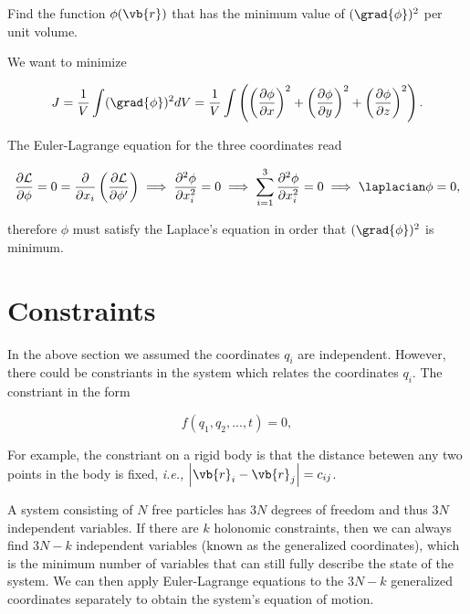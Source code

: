 \documentclass[a4paper,12pt]{report}
\begin{document}
{Find the function \(\phi (\vb{r} )\) that has the minimum value of \((\grad{\phi })^2\) per unit volume.  }
{We want to minimize 

\begin{equation}
	J = \frac{1}{V} \int (\grad{\phi } )^2 dV = \frac{1}{V} \int \left( \left( \frac{\partial \phi }{\partial x}  \right)^2 + \left( \frac{\partial \phi }{\partial y}  \right)^2 + \left( \frac{\partial \phi }{\partial z}  \right)^2 \right).
\end{equation}

The Euler-Lagrange equation for the three coordinates read

\begin{equation}
	\frac{\partial \mathcal{L}}{\partial \phi } = 0 = \frac{\partial }{\partial x_{i} } \left( \frac{\partial \mathcal{L}}{\partial \phi '}  \right) \implies \frac{\partial^2 \phi }{\partial x_{i} ^2} = 0 \implies \sum_{i=1}^{3} \frac{\partial^2 \phi }{\partial x_{i} ^2} = 0 \implies \laplacian \phi =0,
\end{equation}

therefore \(\phi \) must satisfy the Laplace's equation in order that \((\grad{\phi } )^2\) is minimum.  


} 

\section{Constraints} \label{constraints} 
In the above section we assumed the coordinates \(q_{i} \) are independent. However, there could be constriants in the system which relates the coordinates \(q_{i} \). The constriant in the form

\begin{equation}
	f(q_{1}, q_{2}, ..., t) = 0,
\end{equation}

For example, the constriant on a rigid body is that the distance betewen any two points in the body is fixed, \textit{i.e.,} \(	\left| \vb{r} _{i} - \vb{r} _{j}  \right| = c_{ij} \).  

A system consisting of \(N\) free particles has \(3N\) degrees of freedom and thus \(3N\) independent variables. If there are \(k\) holonomic constraints, then we can always find \(3N-k\) independent variables (known as the generalized coordinates), which is the minimum number of variables that can still fully describe the state of the system. We can then apply Euler-Lagrange equations to the \(3N-k\) generalized coordinates separately to obtain the system's equation of motion. 
\end{document}
